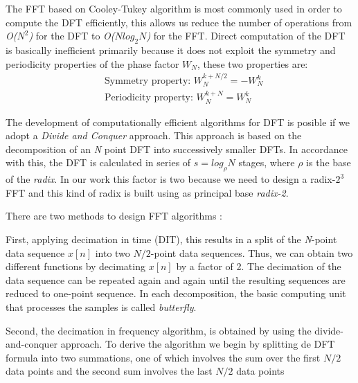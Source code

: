 \documentclass[journal,comsoc]{IEEEtran}
\begin{document}
The FFT based on Cooley-Tukey algorithm is most commonly used in order to compute the DFT efficiently, this allows us reduce the number of operations from \textit{O($N^2$)} for the DFT to \textit{O($Nlog_2N$)} for the FFT. Direct computation of the DFT is basically inefficient primarily because it does not exploit the symmetry and periodicity properties of the phase factor $W_N$, these two properties are:
\begin{align}
	&\text{Symmetry property: } W_N^{k+N/2} = -W_N^k	\\
	&\text{Periodicity property: } W_N^{k+N} = W_N^k
\end{align}

The development of computationally efficient algorithms for DFT is posible if we adopt a \textit{Divide and Conquer} approach. This approach is based on the decomposition of an \textit{N} point DFT into successively smaller DFTs. In accordance with this, the DFT is calculated in series of $s=log_\rho N$ stages, where $\rho$ is the base of the \textit{radix}. In our work this factor is two because we need to design a radix-$2^3$ FFT and this kind of radix is built using as principal base \textit{radix-2}.

There are two methods to design FFT algorithms \cite{proakis_digital_nodate,oppenheim_tratamiento_2011}: 

First, applying decimation in time (DIT), this results in a split of the \textit{N}-point data sequence $x[n]$ into two $N/2$-point data sequences. Thus, we can obtain two different functions by decimating $x[n]$ by a factor of 2. The decimation of the data sequence can be repeated again and again until the resulting sequences are reduced to one-point sequence. In each decomposition, the basic computing unit that processes the samples is called \textit{butterfly}.

Second, the decimation in frequency algorithm, is obtained by using the divide-and-conquer approach. To derive the algorithm we begin by splitting de DFT formula into two summations, one of which involves the sum over the first $N/2$ data points and the second sum involves the last $N/2$ data points  
\end{document}
